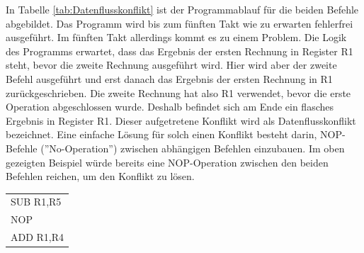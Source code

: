 \documentclass[a4paper,12pt]{article}
\begin{document}
\noindent In Tabelle \ref{tab:Datenflusskonflikt} ist der Programmablauf für die beiden Befehle abgebildet. Das Programm wird bis zum fünften Takt wie zu erwarten fehlerfrei ausgeführt. Im fünften Takt allerdings kommt es zu einem Problem. Die Logik des Programms erwartet, dass das Ergebnis der ersten Rechnung in Register R1 steht, bevor die zweite Rechnung ausgeführt wird. Hier wird aber der zweite Befehl ausgeführt und erst danach das Ergebnis der ersten Rechnung in R1 zurückgeschrieben. Die zweite Rechnung hat also R1 verwendet, bevor die erste Operation abgeschlossen wurde. Deshalb befindet sich am Ende ein flasches Ergebnis in Register R1. Dieser aufgetretene Konflikt wird als Datenflusskonflikt bezeichnet. Eine einfache Lösung für solch einen Konflikt besteht darin, NOP-Befehle (''No-Operation'') zwischen abhängigen Befehlen einzubauen. Im oben gezeigten Beispiel würde bereits eine NOP-Operation zwischen den beiden Befehlen reichen, um den Konflikt zu lösen.


\begin{table}[!htb]
\centering
\begin{tabular}{l}
SUB R1,R5 \\
NOP       \\
ADD R1,R4
\end{tabular}
\end{table}
\end{document}
